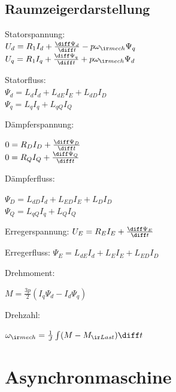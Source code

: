 \documentclass[fs, german]{latex4ei_fs}
\begin{document}
\begin{sectionbox}
\subsection{Raumzeigerdarstellung}
Statorspannung:\\
$U_d = R_1 I_d + \frac{\diff \Psi_d}{\diff t} - p \omega_{\ir mech} \Psi_q$\\
$U_q = R_1 I_q + \frac{\diff \Psi_q}{\diff t} + p \omega_{\ir mech} \Psi_d$

Statorfluss: \\
$\Psi_d = L_d I_d + L_{dE} I_E + L_{dD} I_D$ \\
$\Psi_q = L_q I_q +  L_{qQ} I_Q$


Dämpferspannung:

$0 = R_D I_D + \frac{\diff \Psi_D}{\diff t}$ \\
$0 = R_Q I_Q + \frac{\diff \Psi_Q}{\diff t}$

Dämpferfluss:

$\Psi_D = L_{dD} I_d + L_{ED} I_E + L_D I_D$ \\
$\Psi_Q = L_{qQ} I_q + L_{Q} I_{Q}$

Erregerspannung:
$U_E = R_E I_E + \frac{\diff \Psi_E}{\diff t}$

Erregerfluss:
$\Psi_E = L_{dE} I_d + L_E I_E + L_{ED} I_D$

Drehmoment:

$M = \frac{3 p}{2} (I_q \Psi_d - I_d \Psi_q)$

Drehzahl:

$\omega_{\ir mech} = \frac{1}{J} \int (M- M_{\ir Last}) \diff t$

 
 \end{sectionbox} 

 \section{Asynchronmaschine}
\end{document}
